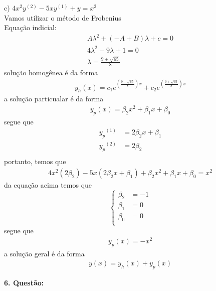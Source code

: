 \documentclass[a4paper,12pt]{article}
\begin{document}
c) $4x^{2}y^{(2)} -5xy^{(1)} + y = x^{2}$ \\
Vamos utilizar o m\'etodo de Frobenius\\
Equa\c c\~ao indicial:
\begin{align*}
	A{\lambda}^{2} + (-A + B){\lambda} + c = 0  \\
	4{\lambda}^{2} -  9{\lambda} + 1 = 0  \\
	{\lambda} = \frac{9 \pm \sqrt{65}}{8}
\end{align*}
solu\c c\~ao homog\^enea \'e da forma 
\begin{align*}
	y_h(x) = c_1 e^{(\frac{9 - \sqrt{65}}{8})x} + c_2 e^{(\frac{9 + \sqrt{65}}{8})x} 
\end{align*}
a solu\c c\~ao particualar \'e da forma 
\begin{align*}
	y_p(x) = {\beta}_2 x^{2} + {\beta}_1 x + {\beta}_0
\end{align*}
segue que 
\begin{align*}
	{y_p}^{(1)} &= 2{\beta}_2 x + {\beta}_1  \\
	{y_p}^{(2)} &= 2{\beta}_2  \\
\end{align*}
portanto, temos que 
\begin{align*}
	4x^{2} (2{\beta}_2) -5x(2{\beta}_2 x + {\beta}_1) + {\beta}_2 x^{2} + {\beta}_1 x + {\beta}_0 = x^{2}
\end{align*}
da equa\c c\~ao acima temos que 
\[ \left \{ \begin{array}{cc}
		{\beta}_2  &= -1 \\
		{\beta}_1  &= 0\\
		{\beta}_0  &= 0 \\
	\end{array} \right . 
\]
segue que
\begin{align*}
	y_p(x) = -x^{2}
\end{align*}
a solu\c c\~ao geral \'e da forma 
\begin{align*}
	y(x) = y_h(x) + y_p(x)
\end{align*}

\textbf{6. Quest\~ao:}\\
\end{document}
